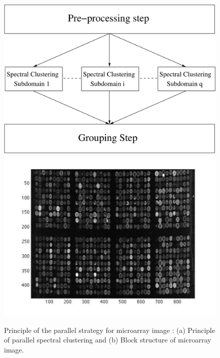 \documentclass[]{svmult}
\begin{document}
\begin{figure}
  \begin{center}
    {\includegraphics[width=0.40\linewidth]{intersectionq}}
    \hspace{1cm}
    { {\includegraphics[width=0.40\linewidth]{pucegris}}}
  \end{center}
  \caption{Principle of the parallel strategy for microarray image : (a) Principle of parallel spectral clustering and (b) Block structure of microarray image.}
  \label{fig:principe}
\end{figure}
\end{document}
